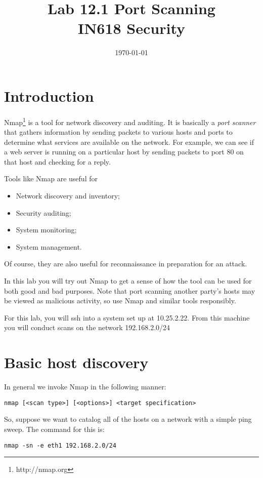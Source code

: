 \documentclass{article}
\begin{document}
\title{ Lab 12.1 Port Scanning\\ IN618 Security}
\date{\today}
\maketitle

\section*{Introduction}
Nmap\footnote{http://nmap.org} is a tool for network discovery and auditing.  It is basically a \emph{port scanner} that gathers information by sending packets to various hosts and ports to determine what services are available on the network.  For example, we can see if a web server is running on a particular host by sending packets to port 80 on that host and checking for a reply.

Tools like Nmap are useful for 

\begin{itemize}
    \item Network discovery and inventory;
    \item Security auditing;
    \item System monitoring;
    \item System management.
\end{itemize}

Of course, they are also useful for reconnaissance in preparation for an attack.

In this lab you will try out Nmap to get a sense of how the tool can be used for both good and bad purposes. Note that port scanning another party's hosts may be viewed as malicious activity, so use Nmap and similar tools responsibly.

For this lab, you will ssh into a system set up at 10.25.2.22. From this machine you will conduct scans on the network 192.168.2.0/24



\section{Basic host discovery}
In general we invoke Nmap in the following manner:

\texttt{nmap [<scan type>] [<options>] <target specification>}

So, suppose we want to catalog all of the hosts on a network with a simple ping sweep.  The command for this is:

\texttt{nmap -sn -e eth1 192.168.2.0/24}
\end{document}
